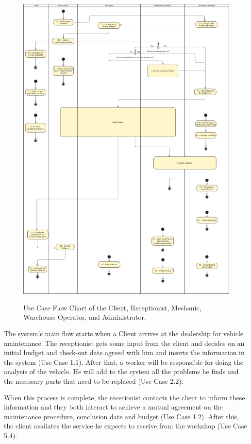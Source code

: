 \begin{figure}[h]
  \caption{Use Case Flow Chart of the Client, Receptionist, Mechanic, Warehouse Operator, and Administrator.}
  \centering
  \includegraphics[width=\textwidth]{figs/UseCaseDiagram - General}
  \label{fig:figure2}
\end{figure}

The system's main flow starts when a Client arrives at the dealership for vehicle maintenance. 
The receptionist gets some input from the client and decides on an initial budget and check-out date agreed with him and inserts the information in the system (Use Case 1.1).
After that, a worker will be responsible for doing the analysis of the vehicle. 
He will add to the system all the problems he finds and the necessary parts that need to be replaced (Use Case 2.2).

When this process is complete, the rececionist contacts the client to inform these information and they both interact to achieve a mutual agreement on the maintenance procedure, conclusion date and budget (Use Case 1.2). After this, the client avaliates the service he expects to receive from the workshop (Use Case 5.4).

